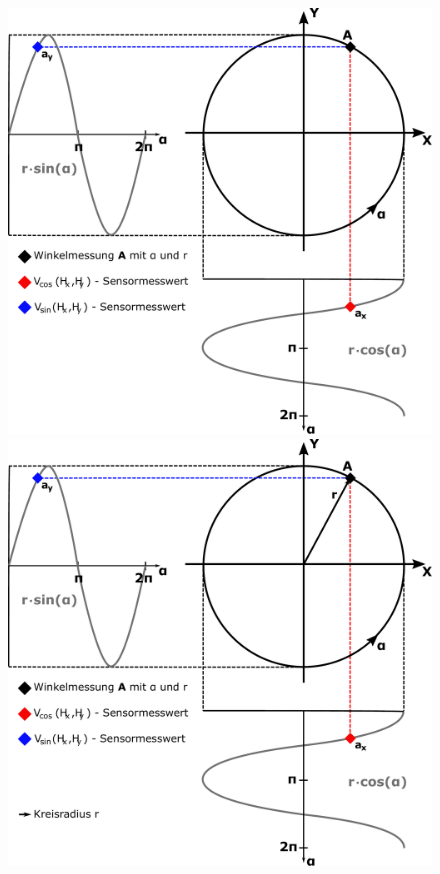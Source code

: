 \documentclass{beamer}
\begin{document}
\begin{frame}
\begin{columns}[c]
	\begin{figure}
		\begin{overprint}
			\includegraphics[width=\linewidth]{images/Kreisdarstellung_Winkelmessung-1}
			\onslide<2>\includegraphics[width=\linewidth]{images/Kreisdarstellung_Winkelmessung-2}

\end{overprint}
\end{figure}
\end{columns}
\end{frame}
\end{document}
